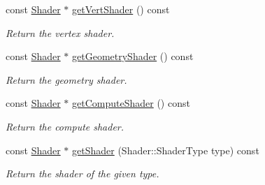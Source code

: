 \begin{Indent}
\begin{DoxyCompactItemize}
\mbox{\label{classrev_1_1_shader_program_aba43a7e9632afaf583241db5e7fed7a0}} 
const \mbox{\hyperlink{classrev_1_1_shader}{Shader}} $\ast$ \mbox{\hyperlink{classrev_1_1_shader_program_aba43a7e9632afaf583241db5e7fed7a0}{get\+Vert\+Shader}} () const
\begin{DoxyCompactList}\small\item\em Return the vertex shader. \end{DoxyCompactList}\item 
\mbox{\label{classrev_1_1_shader_program_ad8969cca780f6d098c492d08249ca106}} 
const \mbox{\hyperlink{classrev_1_1_shader}{Shader}} $\ast$ \mbox{\hyperlink{classrev_1_1_shader_program_ad8969cca780f6d098c492d08249ca106}{get\+Geometry\+Shader}} () const
\begin{DoxyCompactList}\small\item\em Return the geometry shader. \end{DoxyCompactList}\item 
\mbox{\label{classrev_1_1_shader_program_ab1a938094a7d84eef5cac303ccd3060a}} 
const \mbox{\hyperlink{classrev_1_1_shader}{Shader}} $\ast$ \mbox{\hyperlink{classrev_1_1_shader_program_ab1a938094a7d84eef5cac303ccd3060a}{get\+Compute\+Shader}} () const
\begin{DoxyCompactList}\small\item\em Return the compute shader. \end{DoxyCompactList}\item 
\mbox{\label{classrev_1_1_shader_program_a5e1a63c6d678cc91983304b4a307a276}} 
const \mbox{\hyperlink{classrev_1_1_shader}{Shader}} $\ast$ \mbox{\hyperlink{classrev_1_1_shader_program_a5e1a63c6d678cc91983304b4a307a276}{get\+Shader}} (Shader\+::\+Shader\+Type type) const
\begin{DoxyCompactList}\small\item\em Return the shader of the given type. \end{DoxyCompactList}\end{DoxyCompactItemize}
\end{Indent}
